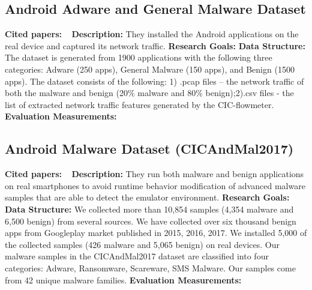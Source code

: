 \subsection{Android Adware and General Malware Dataset}
\textbf{Cited papers:} ~\cite{lashkari2017towards}\newline
\textbf{Description:} They installed the Android applications on the real device and captured its network traffic.\newline
\textbf{Research Goals:}  \newline
\textbf{Data Structure:} The dataset is generated from 1900 applications with the following three categories: Adware (250 apps), General Malware (150 apps), and Benign (1500 apps). The dataset consists of the following: 1) .pcap files – the network traffic of both the malware and benign (20\% malware and 80\% benign);2).csv files - the list of extracted network traffic features generated by the CIC-flowmeter.\newline
\textbf{Evaluation Measurements:} \newline



\subsection{Android Malware Dataset (CICAndMal2017)}
\textbf{Cited papers:} ~\cite{shiravi2012toward}\newline
\textbf{Description:} They run both malware and benign applications on real smartphones to avoid runtime behavior modification of advanced malware samples that are able to detect the emulator environment. \newline
\textbf{Research Goals:}  \newline
\textbf{Data Structure:} We collected more than 10,854 samples (4,354 malware and 6,500 benign) from several sources. We have collected over six thousand benign apps from Googleplay market published in 2015, 2016, 2017. We installed 5,000 of the collected samples (426 malware and 5,065 benign) on real devices. Our malware samples in the CICAndMal2017 dataset are classified into four categories: Adware, Ransomware, Scareware, SMS Malware. Our samples come from 42 unique malware families. \newline
\textbf{Evaluation Measurements:} \newline


